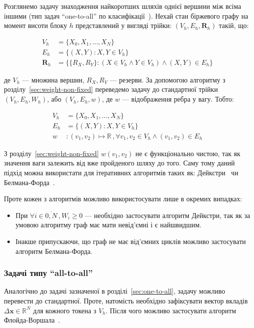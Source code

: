 \documentclass[../index.tex]{subfiles}
\begin{document}
Розглянемо задачу знаходження найкоротших шляхів однієї вершини між всіма іншими
(тип задач ``one-to-all'' по класифікації~\cite{deo1980shortest}). Нехай стан
біржевого графу на момент висоти блоку $h$ представлений у вигляді трійки:
$(V_{h}, E_{h}, \mathbf{R}_{h})$ такій, що:

\begin{equation}
  \begin{aligned}
    V_{h} &= \{ X_{0}, X_{1}, \ldots, X_{N}\} \\
    E_{h} &= \{(X, Y): X, Y \in V_{h}\}\\
    \mathbf{R}_{h} &= \{ \{R_{X}, R_{Y}\}: (X \in V_{h} \land Y \in V_{h}) \land (X, Y) \in E_{h} \}
  \end{aligned}
\end{equation}

де $V_{h}$ --- множина вершин, $R_{X}, R_{Y}$ --- резерви. За допомогою алгоритму з
розділу~\ref{sec:weight-non-fixed} переведемо задачу до стандартної трійки
$(V_{h}, E_{h}, W_{h})$, або $(V_{h}, E_{h}, w)$, де $w$ --- відображення ребра у
вагу. Тобто:

\begin{equation}
  \begin{aligned}
    V_{h} &= \{ X_{0}, X_{1}, \ldots, X_{N}\} \\
    E_{h} &= \{(X, Y): X, Y \in V_{h}\}\\
    w &: (v_{1}, v_{2}) \mapsto \mathbb{R} \,, \forall v_{1}, v_{2} \in V_{h} \land (v_{1}, v_{2}) \in E_{h}
  \end{aligned}
\end{equation}

З розділу~\ref{sec:weight-non-fixed} $w(v_{1}, v_{2})$ не є функціонально
чистою, так як значення ваги залежить від вже пройденого шляху до того. Саму
тому даний підхід можна використати для ітеративних алгоритмів таких як:
Дейкстри~\cite{dijkstra} чи Белмана-Форда~\cite{bellman}.

Проте кожен з алгоритмів можливо використосувати лише в окремих випадках:

\begin{itemize}
  \item При $\forall i \in \overline{0, N} \, , W_{i} \geq 0 $ --- необхідно застосувати
        алгоритм Дейкстри, так як за умовою алгоритму граф має мати невід'ємні і
        є найшвидшим.
  \item Інакше припускаючи, що граф не має від'ємних циклів можливо застосувати
        алгоритм Белмана-Форда.
\end{itemize}

\subsubsection{Задачі типу ``all-to-all''}

Аналогічно до задачі зазначеної в розділі~\ref{sec:one-to-all}, задачу можливо
перевести до стандартної. Проте, натомість необхідно зафіксувати вектор вкладів
$\Delta \mathbf{x} \in \mathbb{R}^{N}$ для кожного токена з $V_{h}$. Після чого можливо
застосувати алгоритм Флойда-Воршала~\cite{floyd_warshall_alg}.
\end{document}
